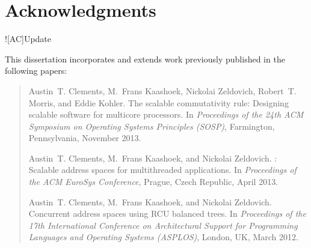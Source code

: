\chapter*{Acknowledgments}

\XXX![AC]{Update}




This dissertation incorporates and extends work previously published
in the following papers:

\begin{quote}
  Austin~T. Clements, M.~Frans Kaashoek, Nickolai Zeldovich,
  Robert~T. Morris, and Eddie Kohler.
  \newblock The scalable commutativity rule: Designing scalable
  software for multicore processors.
  \newblock In \emph{Proceedings of the 24th ACM Symposium on
    Operating Systems Principles (\mbox{SOSP})}, Farmington,
  Pennsylvania, November 2013.

  Austin~T. Clements, M.~Frans Kaashoek, and Nickolai Zeldovich.
  : Scalable address spaces for multithreaded
  applications.
  \newblock In \emph{Proceedings of the ACM EuroSys Conference},
  Prague, Czech Republic, April 2013.

  Austin~T. Clements, M.~Frans Kaashoek, and Nickolai Zeldovich.
  \newblock Concurrent address spaces using {RCU} balanced trees.
  \newblock In \emph{Proceedings of the 17th International Conference
    on Architectural Support for Programming Languages and Operating
    Systems (\mbox{ASPLOS})}, London, UK, March 2012.
\end{quote}
